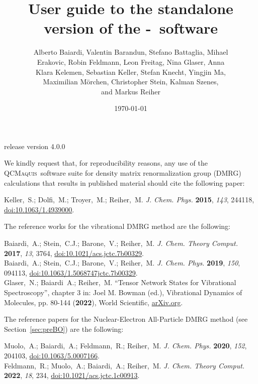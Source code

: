 \documentclass[bibliography=totoc,12pt,a4paper]{scrartcl}
\title{User guide to the standalone version of the \scine-\qcm\ software}
\author{Alberto Baiardi, Valentin Barandun, Stefano Battaglia, Mihael \\ Erakovic, Robin Feldmann, Leon Freitag, Nina Glaser, Anna \\ Klara Kelemen, Sebastian Keller, Stefan Knecht, Yingjin Ma, \\ Maximilian M\"orchen, Christopher Stein, Kalman Szenes, \\ and Markus Reiher}
\date{\today}
\newcommand{\relv}{release version 4.0.0}
\newcommand{\qcm}{\textsc{QCMaquis}}
\begin{document}


\maketitle
\thispagestyle{empty}
\begin{center}
\end{center}
\vspace{-1.85cm}
\centerline{\large{\relv}}

\vspace{2cm}

\noindent We kindly request that, for reproducibility reasons, any use of the \qcm\ software suite for density matrix renormalization group (DMRG) calculations that results in published material should cite the following paper:

\begin{framed}
\noindent Keller,~S.; Dolfi,~M.; Troyer,~M.; Reiher,~M. \emph{J. Chem. Phys.}
  \textbf{2015}, \emph{143}, 244118, \href{https://doi.org/10.1063/1.4939000}{doi:10.1063/1.4939000}.
\end{framed}

The reference works for the vibrational DMRG method are the following:

\begin{framed}
  \noindent Baiardi,~A.; Stein,~C.J.; Barone,~V.; Reiher,~M. \emph{J. Chem. Theory Comput.}
  \textbf{2017}, \emph{13}, 3764, \href{https://doi.org/10.1021/acs.jctc.7b00329}{doi:10.1021/acs.jctc.7b00329}. \\
  \noindent Baiardi,~A.; Stein,~C.J.; Barone,~V.; Reiher,~M. \emph{J. Chem. Phys.}
  \textbf{2019}, \emph{150}, 094113, \href{https://doi.org/10.1063/1.5068747jctc.7b00329}{doi:10.1063/1.5068747jctc.7b00329}. \\
  \noindent Glaser,~N.; Baiardi~A.; Reiher,~M. ``Tensor Network States for Vibrational Spectroscopy'', chapter 3 in: Joel M. Bowman (ed.), Vibrational Dynamics of Molecules, pp. 80-144 (\textbf{2022}), World Scientific, \href{https://arxiv.org/abs/2109.08961}{arXiv.org}. \\
\end{framed}

The reference papers for the Nuclear-Electron All-Particle DMRG method (see Section~\ref{sec:preBO}) are the following:

\begin{framed}
  \noindent Muolo,~A.; Baiardi,~A.; Feldmann,~R.; Reiher,~M. \emph{J. Chem. Phys.} \textbf{2020}, \emph{152}, 204103, \href{https://doi.org/10.1063/5.0007166}{doi:10.1063/5.0007166}. \\
  \noindent Feldmann,~R.; Muolo,~A.; Baiardi,~A.; Reiher,~M. \emph{J. Chem. Theory Comput.} \textbf{2022}, \emph{18}, 234, \href{https://doi.org/10.1021/acs.jctc.1c00913}{doi:10.1021/acs.jctc.1c00913}. 
\end{framed}
\end{document}
